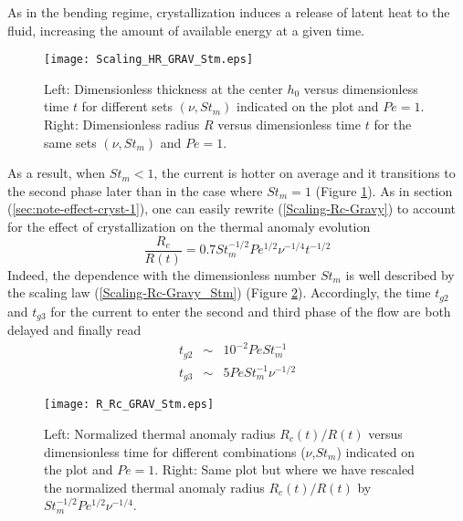 As in the bending regime,  crystallization induces a release of latent
heat to  the fluid,  increasing the  amount of  available energy  at a
given time.
\begin{figure}
  \begin{center}
    \graphicspath{ {/Users/thorey/Documents/These/Projet/Refroidissement/Skin_Model/Figure/JFM_V13/} }
    \texttt{[image: Scaling\_HR\_GRAV\_Stm.eps]}
    \caption{Left: Dimensionless thickness at  the center $h_0$ versus
      dimensionless time $t$ for different sets $(\nu,St_m)$ indicated
      on the plot  and $Pe=1$. Right: Dimensionless  radius $R$ versus
      dimensionless  time  $t$  for  the same  sets  $(\nu,St_m)$  and
      $Pe=1$.}
    \label{Scaling_HR_GRAV_Stm}
  \end{center}
\end{figure}
As a  result, when $St_m<1$, the  current is hotter on  average and it
transitions to the second phase later  than in the case where $St_m=1$
(Figure      \ref{Scaling_HR_GRAV_Stm}).       As      in      section
(\ref{sec:note-effect-cryst-1}),     one     can    easily     rewrite
(\ref{Scaling-Rc-Gravy}) to account for  the effect of crystallization
on the thermal anomaly evolution
\begin{equation}
  \frac{R_c}{R(t)} = 0.7 St_m^{-1/2}Pe^{1/2}\nu^{-1/4}t^{-1/2}
  \label{Scaling-Rc-Gravy_Stm}
\end{equation}
Indeed, the  dependence with the  dimensionless number $St_m$  is well
described  by  the  scaling law  (\ref{Scaling-Rc-Gravy_Stm})  (Figure
\ref{R_Rc_GRAV_Stm}).  Accordingly, the time $t_{g2}$ and $t_{g3}$ for
the  current to  enter the  second  and third  phase of  the flow  are
both delayed and finally read
\begin{eqnarray}
  t_{g2}&\sim&10^{-2}PeSt_m^{-1}\label{tg2}\\
  t_{g3}&\sim& 5Pe St_m^{-1}\nu^{-1/2}\label{tg3}
\end{eqnarray}

\begin{figure}
  \begin{center}
    \graphicspath{ {/Users/thorey/Documents/These/Projet/Refroidissement/Skin_Model/Figure/JFM_V13/} }
    \texttt{[image: R\_Rc\_GRAV\_Stm.eps]}
    \caption{Left:  Normalized  thermal anomaly  radius  $R_c(t)/R(t)$
      versus    dimensionless   time    for   different    combinations
      ($\nu$,$St_m$) indicated  on the  plot and $Pe=1$.   Right: Same
      plot but where  we have rescaled the  normalized thermal anomaly
      radius $R_c(t)/R(t)$ by $St_m^{-1/2}Pe^{1/2}\nu^{-1/4}$.}
    \label{R_Rc_GRAV_Stm}
  \end{center}
\end{figure}


